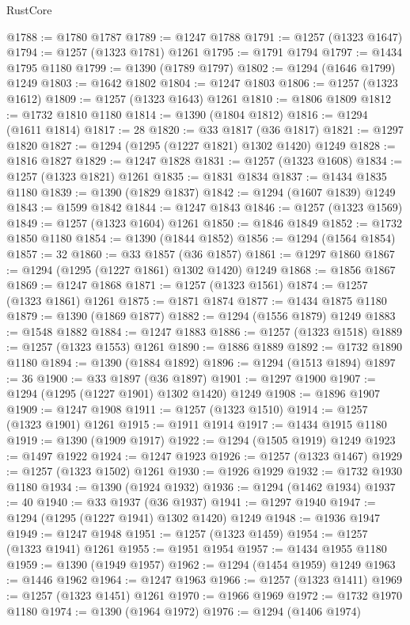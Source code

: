 \begin{lexlean}{RustCore}
\begin{coremodule}
@1788 := @1780 @1787
@1789 := @1247 @1788
@1791 := @1257 (@1323 @1647)
@1794 := @1257 (@1323 @1781) @1261
@1795 := @1791 @1794
@1797 := @1434 @1795 @1180
@1799 := @1390 (@1789 @1797)
@1802 := @1294 (@1646 @1799) @1249
@1803 := @1642 @1802
@1804 := @1247 @1803
@1806 := @1257 (@1323 @1612)
@1809 := @1257 (@1323 @1643) @1261
@1810 := @1806 @1809
@1812 := @1732 @1810 @1180
@1814 := @1390 (@1804 @1812)
@1816 := @1294 (@1611 @1814)
@1817 := 28
@1820 := @33 @1817 (@36 @1817)
@1821 := @1297 @1820
@1827 := @1294 (@1295 (@1227 @1821) @1302 @1420) @1249
@1828 := @1816 @1827
@1829 := @1247 @1828
@1831 := @1257 (@1323 @1608)
@1834 := @1257 (@1323 @1821) @1261
@1835 := @1831 @1834
@1837 := @1434 @1835 @1180
@1839 := @1390 (@1829 @1837)
@1842 := @1294 (@1607 @1839) @1249
@1843 := @1599 @1842
@1844 := @1247 @1843
@1846 := @1257 (@1323 @1569)
@1849 := @1257 (@1323 @1604) @1261
@1850 := @1846 @1849
@1852 := @1732 @1850 @1180
@1854 := @1390 (@1844 @1852)
@1856 := @1294 (@1564 @1854)
@1857 := 32
@1860 := @33 @1857 (@36 @1857)
@1861 := @1297 @1860
@1867 := @1294 (@1295 (@1227 @1861) @1302 @1420) @1249
@1868 := @1856 @1867
@1869 := @1247 @1868
@1871 := @1257 (@1323 @1561)
@1874 := @1257 (@1323 @1861) @1261
@1875 := @1871 @1874
@1877 := @1434 @1875 @1180
@1879 := @1390 (@1869 @1877)
@1882 := @1294 (@1556 @1879) @1249
@1883 := @1548 @1882
@1884 := @1247 @1883
@1886 := @1257 (@1323 @1518)
@1889 := @1257 (@1323 @1553) @1261
@1890 := @1886 @1889
@1892 := @1732 @1890 @1180
@1894 := @1390 (@1884 @1892)
@1896 := @1294 (@1513 @1894)
@1897 := 36
@1900 := @33 @1897 (@36 @1897)
@1901 := @1297 @1900
@1907 := @1294 (@1295 (@1227 @1901) @1302 @1420) @1249
@1908 := @1896 @1907
@1909 := @1247 @1908
@1911 := @1257 (@1323 @1510)
@1914 := @1257 (@1323 @1901) @1261
@1915 := @1911 @1914
@1917 := @1434 @1915 @1180
@1919 := @1390 (@1909 @1917)
@1922 := @1294 (@1505 @1919) @1249
@1923 := @1497 @1922
@1924 := @1247 @1923
@1926 := @1257 (@1323 @1467)
@1929 := @1257 (@1323 @1502) @1261
@1930 := @1926 @1929
@1932 := @1732 @1930 @1180
@1934 := @1390 (@1924 @1932)
@1936 := @1294 (@1462 @1934)
@1937 := 40
@1940 := @33 @1937 (@36 @1937)
@1941 := @1297 @1940
@1947 := @1294 (@1295 (@1227 @1941) @1302 @1420) @1249
@1948 := @1936 @1947
@1949 := @1247 @1948
@1951 := @1257 (@1323 @1459)
@1954 := @1257 (@1323 @1941) @1261
@1955 := @1951 @1954
@1957 := @1434 @1955 @1180
@1959 := @1390 (@1949 @1957)
@1962 := @1294 (@1454 @1959) @1249
@1963 := @1446 @1962
@1964 := @1247 @1963
@1966 := @1257 (@1323 @1411)
@1969 := @1257 (@1323 @1451) @1261
@1970 := @1966 @1969
@1972 := @1732 @1970 @1180
@1974 := @1390 (@1964 @1972)
@1976 := @1294 (@1406 @1974)

\end{coremodule}
\end{lexlean}
